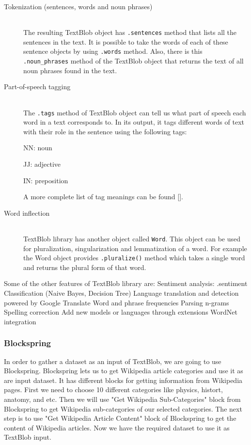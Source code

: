\documentclass[a4paper]{article}
\begin{document}
\begin{description}
  \item[Tokenization (sentences, words and noun phrases)] \hfill \\
  The resulting TextBlob object has \texttt{.sentences} method that lists all the sentences in the text. It is possible to take the words of each of these sentence objects by using \texttt{.words} method. Also, there is this \texttt{.noun\_phrases} method of the TextBlob object that returns the text of all noun phrases found in the text.
  
  \item[Part-of-speech tagging] \hfill \\
  The \texttt{.tags} method of TextBlob object can tell us what part of speech each word in a text corresponds to. In its output, it tags different words of text with their role in the sentence using the following tags: 

  NN: noun

  JJ: adjective

  IN: preposition

  A more complete list of tag meanings can be found [].
 
  \item[Word inflection] \hfill \\
  TextBlob library has another object called \texttt{Word}. This object can be used for pluralization, singularization and lemmatization of a word. For example the Word object provides \texttt{.pluralize()} method which takes a single word and returns the plural form of that word. 
  
\end{description}

Some of the other features of TextBlob library are:
Sentiment analysis: .sentiment
Classification (Naive Bayes, Decision Tree)
Language translation and detection powered by Google Translate
Word and phrase frequencies
Parsing
n-grams
Spelling correction
Add new models or languages through extensions
WordNet integration


\subsubsection{Blockspring}

In order to gather a dataset as an input of TextBlob, we are going to use Blockspring. Blockspring lets us to get Wikipedia article categories and use it as are input dataset. It has different blocks for getting information from Wikipedia pages. First we need to choose 10 different categories like physics, histort, anatomy, and etc. Then we will use "Get Wikipedia Sub-Categories" block from Blockspring to get Wikipedia sub-categories of our selected categories. The next step is to use "Get Wikipedia Article Content" block of Blockspring to get the content of Wikipedia articles. Now we have the required dataset to use it as TextBlob input. 
\end{document}
